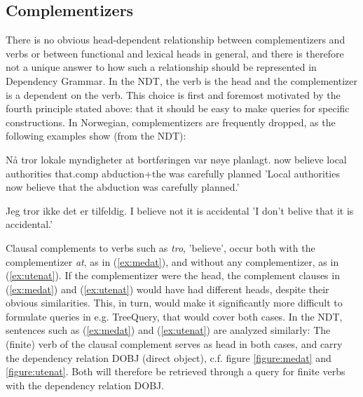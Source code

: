 \documentclass[11pt,a4paper]{article}
\begin{document}
\subsection{Complementizers}
There is no obvious head-dependent relationship between complementizers and verbs or between functional and lexical heads in general, and there is therefore not a unique answer to how such a relationship should be represented in Dependency Grammar.
In the NDT, the verb is the head and the complementizer is a dependent on the verb. This choice is first and foremost motivated by the fourth principle stated above: that it should be easy to make queries for specific constructions. In Norwegian, complementizers are frequently dropped, as the following examples show (from the NDT):
\begin{examples}
\item\label{ex:medat}
\gll Nå tror lokale myndigheter at bortføringen var nøye planlagt.
now believe local authorities that.comp abduction+the was carefully planned
\glt 'Local authorities now believe that the abduction was carefully planned.'
\glend

\item\label{ex:utenat}
\gll Jeg tror ikke det er tilfeldig.
I believe not it is accidental
\glt 'I don't belive that it is accidental.'
\glend
\end{examples}
 
Clausal complements to verbs such as \emph{tro}, 'believe', occur both with the complementizer \emph{at}, as in (\ref{ex:medat}), and without any complementizer, as in (\ref{ex:utenat}). If the complementizer were the head, the complement clauses in (\ref{ex:medat}) and (\ref{ex:utenat}) would have had different heads, despite their obvious similarities. This, in turn, would make it significantly more difficult to formulate queries in e.g. TreeQuery, that would cover both cases.
In the NDT, sentences such as (\ref{ex:medat}) and (\ref{ex:utenat}) are analyzed similarly: The (finite) verb of the clausal complement serves as head in both cases, and carry the dependency relation DOBJ (direct object), c.f. figure \ref{figure:medat} and \ref{figure:utenat}. Both will therefore be retrieved through a query for finite verbs with the dependency relation DOBJ.
\end{document}

